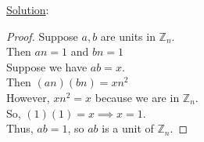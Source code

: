 \documentclass{article} %
\begin{document}
\underline{Solution}: 
\begin{addmargin}[1em]{0em}
\begin{proof}
Suppose $a,b$ are units in $\mathbb{Z}_n$.
\\Then $an = 1$ and $bn = 1$
\\Suppose we have $ab = x$.
\\Then $(an)(bn) = xn^2$
\\However, $xn^2 = x$ because we are in $\mathbb{Z}_n$.
\\So, $(1)(1) = x \implies x = 1$.
\\Thus, $ab = 1$, so $ab$ is a unit of $\mathbb{Z}_n$.
\end{proof}
\end{addmargin}

\newpage
\end{document}
